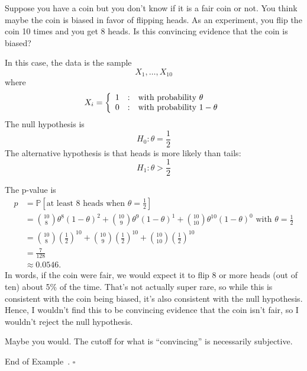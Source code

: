 \documentclass[10pt]{article}
\theoremstyle{definition}
\newtheorem{example}[theorem]{Example}
\renewenvironment{example}
{\begin{oldexample}}
  {\par\smallskip\hfill   End of Example~\theexample. $\square$    \par\end{oldexample}}
\newcommand{\1}[1]{\textbf{1}_{\left[#1\right]}} %
\def\P{\mathbb{P}} %
\begin{document}
\begin{example}[Coin flipping hypothesis test, $n=10$]
  \label{ex:coin-flipping-hypothesis-test--10-flips}
  Suppose you have a coin but you don't know if it is a fair coin or not. You
  think maybe the coin is biased in favor of flipping heads. As an experiment,
  you flip the coin 10 times and you get 8 heads. Is this convincing evidence
  that the coin is biased?

  In this case, the data is the sample
  \begin{equation*}
    X_{1},\ldots,X_{10}
  \end{equation*}
  where
  \begin{equation*}
    X_{i}= \left\{ \begin{array}{l@{\quad:\quad}l} 1 & \text{with probability }\theta\\ 0&\text{with probability }1-\theta \end{array}\right.
  \end{equation*}
  The null hypothesis is
  \begin{equation*}
    H_{0}: \theta=\frac{1}{2}
  \end{equation*}
  The alternative hypothesis is that heads is more likely than tails:
  \begin{equation*}
    H_{1}: \theta>\frac{1}{2}
  \end{equation*}

  The p-value is
  \begin{align*}
    p 
    &= \P\left[\text{at least 8 heads when } \theta=\frac{1}{2} \right]\\
    &= {10 \choose 8}\theta^{8}(1-\theta)^{2}+{10 \choose
      9}\theta^{9}(1-\theta)^{1}+{10 \choose 10}\theta^{10}(1-\theta)^{0}
      \text{ with } \theta=\frac{1}{2}\\
    &= {10\choose 8} \left( \frac{1}{2} \right)^{10} +{10\choose 9} \left( \frac{1}{2} \right)^{10} +{10\choose 10} \left( \frac{1}{2} \right)^{10}\\ 
    &= \frac{7}{128}\\
    &\approx 0.0546.
  \end{align*}
  In words, if the coin were fair, we would expect it to flip 8 or more heads
  (out of ten) about 5\% of the time. That's not actually super rare, so while
  this is consistent with the coin being biased, it's also consistent with the
  null hypothesis. Hence, I wouldn't find this to be convincing evidence that
  the coin isn't fair, so I wouldn't reject the null hypothesis.

  Maybe you would. The cutoff for what is ``convincing'' is necessarily
  subjective.
\end{example}
\end{document}
